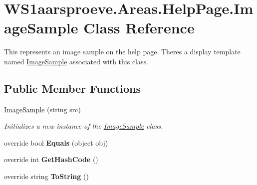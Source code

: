 \hypertarget{class_w_s1aarsproeve_1_1_areas_1_1_help_page_1_1_image_sample}{}\section{W\+S1aarsproeve.\+Areas.\+Help\+Page.\+Image\+Sample Class Reference}
\label{class_w_s1aarsproeve_1_1_areas_1_1_help_page_1_1_image_sample}


This represents an image sample on the help page. There\textquotesingle{}s a display template named \hyperlink{class_w_s1aarsproeve_1_1_areas_1_1_help_page_1_1_image_sample}{Image\+Sample} associated with this class.  


\subsection*{Public Member Functions}
\begin{DoxyCompactItemize}
\item 
\hyperlink{class_w_s1aarsproeve_1_1_areas_1_1_help_page_1_1_image_sample_ad6c0e1fce0d19c70d9c8dc5e27376cc9}{Image\+Sample} (string src)
\begin{DoxyCompactList}\small\item\em Initializes a new instance of the \hyperlink{class_w_s1aarsproeve_1_1_areas_1_1_help_page_1_1_image_sample}{Image\+Sample} class. \end{DoxyCompactList}\item 
\hypertarget{class_w_s1aarsproeve_1_1_areas_1_1_help_page_1_1_image_sample_a56dcbd4f7b6e4e6cf8f09ab1450d2dd1}{}override bool {\bfseries Equals} (object obj)\label{class_w_s1aarsproeve_1_1_areas_1_1_help_page_1_1_image_sample_a56dcbd4f7b6e4e6cf8f09ab1450d2dd1}

\item 
\hypertarget{class_w_s1aarsproeve_1_1_areas_1_1_help_page_1_1_image_sample_a0d8fe8ffab68ab15ef42edb930e69a4e}{}override int {\bfseries Get\+Hash\+Code} ()\label{class_w_s1aarsproeve_1_1_areas_1_1_help_page_1_1_image_sample_a0d8fe8ffab68ab15ef42edb930e69a4e}

\item 
\hypertarget{class_w_s1aarsproeve_1_1_areas_1_1_help_page_1_1_image_sample_a3921588959a0053417e4e4f0dcbe6db0}{}override string {\bfseries To\+String} ()\label{class_w_s1aarsproeve_1_1_areas_1_1_help_page_1_1_image_sample_a3921588959a0053417e4e4f0dcbe6db0}

\end{DoxyCompactItemize}
